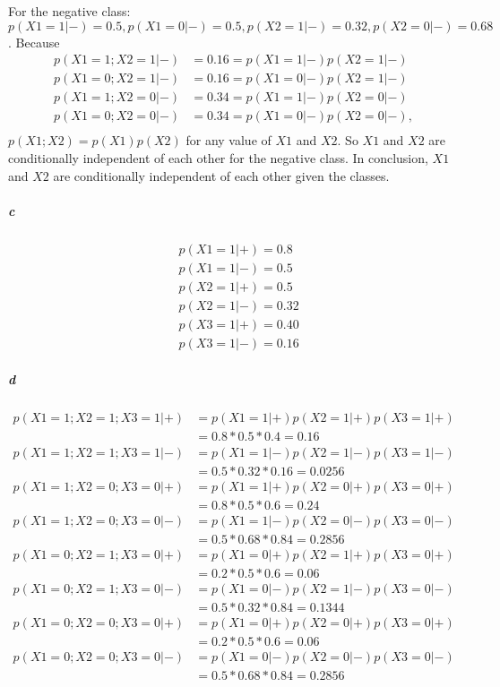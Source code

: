 \documentclass[22pt]{article}
\begin{document}
			For the negative class: $p(X1=1|-) = 0.5, p(X1=0|-) = 0.5,p(X2=1|-)=0.32,p(X2=0|-) = 0.68$.
			Because
			\begin{align}
				p(X1=1;X2 = 1|-) & = 0.16 = p(X1=1|-)p(X2=1|-)\\
				p(X1=0;X2 = 1|-) & = 0.16 = p(X1=0|-)p(X2=1|-)\\
				p(X1=1;X2 = 0|-) & = 0.34 = p(X1=1|-)p(X2=0|-)\\
				p(X1=0;X2 = 0|-) & = 0.34 = p(X1=0|-)p(X2=0|-),\\
			\end{align}
			$p(X1;X2) = p(X1)p(X2)$ for any value of $X1$ and $X2$. So $X1$ and $X2$ are conditionally independent of each other for the negative class. In conclusion, $X1$ and $X2$ are conditionally independent of each other given the classes.

		\subparagraph{c}
		\begin{align}
			& p(X1=1|+) = 0.8 \\
			& p(X1=1|-) = 0.5 \\
			& p(X2=1|+)=0.5 \\
			& p(X2=1|-)=0.32 \\
			& p(X3=1|+)=0.40\\
			& p(X3=1|-)=0.16
		\end{align}

		\subparagraph{d}
		\begin{align}
			p(X1=1;X2=1;X3=1|+) & = p(X1=1|+)p(X2=1|+)p(X3=1|+)\\
			& = 0.8*0.5*0.4 = 0.16\\
			p(X1=1;X2=1;X3=1|-) & = p(X1=1|-)p(X2=1|-)p(X3=1|-)\\
			& = 0.5*0.32*0.16 = 0.0256\\
			p(X1=1;X2=0;X3=0|+) & = p(X1=1|+)p(X2=0|+)p(X3=0|+)\\
			& = 0.8*0.5*0.6 = 0.24\\
			p(X1=1;X2=0;X3=0|-) & = p(X1=1|-)p(X2=0|-)p(X3=0|-)\\
			& = 0.5*0.68*0.84 = 0.2856\\
			p(X1=0;X2=1;X3=0|+) & = p(X1=0|+)p(X2=1|+)p(X3=0|+)\\
			& = 0.2*0.5*0.6 = 0.06\\
			p(X1=0;X2=1;X3=0|-) & = p(X1=0|-)p(X2=1|-)p(X3=0|-)\\
			& = 0.5*0.32*0.84=0.1344\\
			p(X1=0;X2=0;X3=0|+) & = p(X1=0|+)p(X2=0|+)p(X3=0|+)\\
			& = 0.2*0.5*0.6 = 0.06\\
			p(X1=0;X2=0;X3=0|-) & = p(X1=0|-)p(X2=0|-)p(X3=0|-)\\
			& = 0.5*0.68*0.84=0.2856\\
		\end{align}
\end{document}
